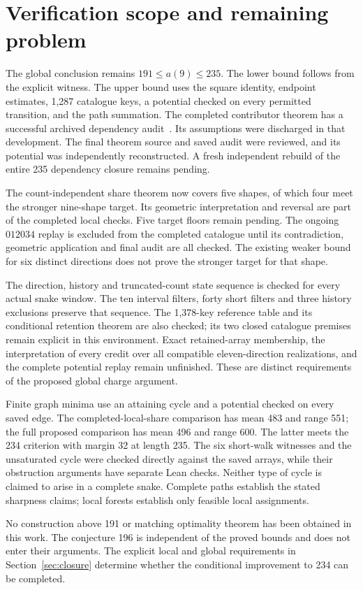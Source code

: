 \section{Verification scope and remaining problem}\label{sec:verification}
The global conclusion remains $191\le a(9)\le235$. The lower bound follows
from the explicit witness. The upper bound uses the square identity, endpoint
estimates, 1,287 catalogue keys, a potential checked on every permitted
transition, and the path summation. The completed contributor theorem has a
successful archived dependency audit~\cite{bound235archive}. Its assumptions
were discharged in that development. The final theorem source and saved audit
were reviewed, and its potential was independently reconstructed. A fresh
independent rebuild of the entire 235 dependency closure remains pending.

The count-independent share theorem now covers five shapes, of which four
meet the stronger nine-shape target. Its geometric interpretation and reversal
are part of the completed local checks. Five target floors remain pending.
The ongoing $012034$ replay is excluded from the completed catalogue until
its contradiction, geometric application and final audit are all checked.
The existing weaker bound for six distinct directions does not prove the
stronger target for that shape.

The direction, history and truncated-count state sequence is checked for every
actual snake window. The ten interval filters, forty short filters and three
history exclusions preserve that sequence. The 1,378-key reference table and
its conditional retention theorem are also checked; its two closed catalogue
premises remain explicit in this environment. Exact retained-array membership,
the interpretation of every credit over all compatible eleven-direction
realizations, and the complete potential replay remain unfinished. These are
distinct requirements of the proposed global charge argument.

Finite graph minima use an attaining cycle and a potential checked on every
saved edge. The completed-local-share comparison has mean 483 and range 551;
the full proposed comparison has mean 496 and range 600. The latter meets the
234 criterion with margin 32 at length 235. The six short-walk witnesses and
the unsaturated cycle were checked directly against the saved arrays, while
their obstruction arguments have separate Lean checks. Neither type of cycle
is claimed to arise in a complete snake. Complete paths establish the stated
sharpness claims; local forests establish only feasible local assignments.

No construction above 191 or matching optimality theorem has been obtained in
this work. The conjecture 196 is independent of the proved bounds and does
not enter their arguments. The explicit local and global requirements in
Section~\ref{sec:closure} determine whether the conditional improvement to
234 can be completed.

